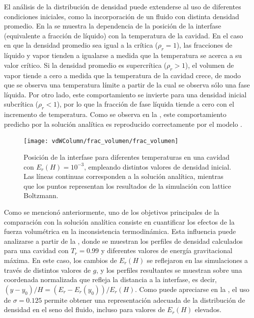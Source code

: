 El an\'alisis de la distribuci\'on de densidad puede extenderse al uso de diferentes condiciones iniciales, como la incorporaci\'on de un fluido con distinta densidad promedio. En la  se muestra la dependencia de la posici\'on de la interfase (equivalente a fracci\'on de l\'iquido) con la temperatura de la cavidad. En el caso en que la densidad promedio sea igual a la cr\'itica ($\rho_r=1$), las fracciones de l\'iquido y vapor tienden a igualarse a medida que la temperatura se acerca a su valor cr\'itico. Si la densidad promedio es supercr\'itica ($\rho_r > 1$), el volumen de vapor tiende a cero a medida que la temperatura de la cavidad crece, de modo que se observa una temperatura l\'imite a partir de la cual se observa s\'olo una fase l\'iquida. Por otro lado, este comportamiento se invierte para una densidad inicial subcr\'itica ($\rho_r < 1$), por lo que la fracci\'on de fase l\'iquida tiende a cero con el incremento de temperatura. Como se observa en la , este comportamiento predicho por la soluci\'on anal\'itica es reproducido correctamente por el modelo \pp{}.

\begin{figure}[ht]
	\centering
	\texttt{[image: vdWColumn/frac\_volumen/frac\_volumen]}
	\caption{Posici\'on de la interfase  para diferentes temperaturas en una cavidad con $E_r(H)=10^{-3}$, empleando distintos valores de densidad inicial. Las l\'ineas continuas corresponden a la soluci\'on anal\'itica, mientras que los puntos representan  los resultados de la simulaci\'on con lattice Boltzmann.}
	\label{fig:vdWColumn_frac_volumen}
\end{figure}

Como se mencion\'o anteriormente, uno de los objetivos principales de la comparaci\'on con la soluci\'on anal\'itica consiste en cuantificar los efectos de la fuerza volum\'etrica en la inconsistencia termodin\'amica. Esta influencia puede analizarse a partir de la , donde se muestran los perfiles de densidad calculados para una cavidad con $T_r=0.99$ y diferentes valores de energ\'ia gravitacional m\'axima. En este caso, los cambios de $E_r(H)$ se reflejaron en las simulaciones a trav\'es de distintos valores de $g$, y los perfiles resultantes se muestran sobre una coordenada normalizada que refleja la distancia a la interfase, es decir, $(y-y_0)/H = (E_r-E_r(y_0)) / E_r(H)$. Como puede apreciarse en la , el uso de $\sigma=0.125$ permite obtener una representaci\'on adecuada de la distribuci\'on de densidad en el seno del fluido, incluso para valores de $E_r(H)$ elevados.

